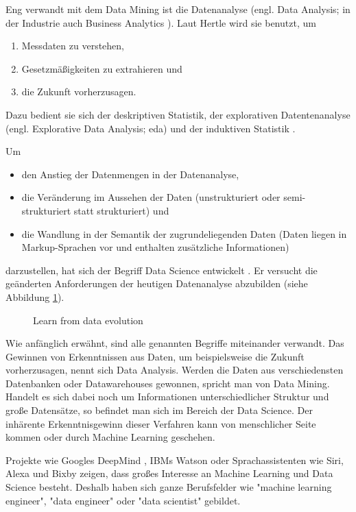 Eng verwandt mit dem Data Mining ist die Datenanalyse (engl. Data Analysis; in der Industrie auch Business Analytics \citep[S.~58]{swamynathan_mastering_2017}). Laut Hertle \citep[S.~2; Teil 1]{hertle_datenanalyse_2016} wird sie benutzt, um
\begin{enumerate}
\item Messdaten zu verstehen,
\item Gesetzmäßigkeiten zu extrahieren und
\item die Zukunft vorherzusagen.
\end{enumerate}
Dazu bedient sie sich der deskriptiven Statistik, der explorativen Datentenanalyse (engl. Explorative Data Analysis; \gls{eda}) und der induktiven Statistik \citep[S.~17]{hertle_datenanalyse_2016}.\par
Um 
\begin{itemize}
\item den Anstieg der Datenmengen in der Datenanalyse,
\item die Veränderung im Aussehen der Daten (unstrukturiert oder semi-strukturiert statt strukturiert) und
\item die Wandlung in der Semantik der zugrundeliegenden Daten (Daten liegen in Markup-Sprachen vor und enthalten zusätzliche Informationen)
\end{itemize}
darzustellen, hat sich der Begriff Data Science entwickelt \citep{dhar_data_2013}. Er versucht die geänderten Anforderungen der heutigen Datenanalyse abzubilden (siehe Abbildung \ref{fig:dataEvolution}).

\begin{figure}[H]
\centering
{}
\caption{Learn from data evolution \citep[S.~66]{swamynathan_mastering_2017}}
\label{fig:dataEvolution}
\end{figure}
Wie anfänglich erwähnt, sind alle genannten Begriffe miteinander verwandt. Das Gewinnen von Erkenntnissen aus Daten, um beispielsweise die Zukunft vorherzusagen, nennt sich Data Analysis. Werden die Daten aus verschiedensten Datenbanken oder Datawarehouses gewonnen, spricht man von Data Mining. Handelt es sich dabei noch um Informationen unterschiedlicher Struktur und große Datensätze, so befindet man sich im Bereich der Data Science. Der inhärente Erkenntnisgewinn dieser Verfahren kann von menschlicher Seite kommen oder durch Machine Learning geschehen.\par
Projekte wie Googles DeepMind \citep{deepmind_deepmind_2017}, IBMs Watson \citep{ibm_ibm_2017} oder Sprachassistenten wie Siri, Alexa und Bixby zeigen, dass großes Interesse an Machine Learning und Data Science besteht. Deshalb haben sich ganze Berufsfelder wie "machine learning engineer", "data engineer" oder "data scientist" \citep[S.~1]{ramasubramanian_machine_2017} gebildet.


